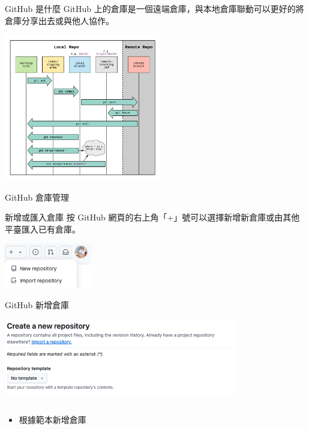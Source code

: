 \documentclass[xetex, unicode, 10pt, aspectratio=169]{beamer}
\begin{document}
\begin{frame}{GitHub 是什麼}
    GitHub 上的倉庫是一個遠端倉庫，與本地倉庫聯動可以更好的將倉庫分享出去或與他人協作。
    \begin{center}
        \includegraphics[width=2.7in]{./img/git-workflow.png}
    \end{center}
\end{frame}

\begin{frame}{GitHub 倉庫管理}
    \begin{block}{新增或匯入倉庫}
        按 GitHub 網頁的右上角「+」號可以選擇新增新倉庫或由其他平臺匯入已有倉庫。
        \begin{center}
            \includegraphics[width=1.5in]{./img/github-add-import-repo.png}
        \end{center}
    \end{block}
\end{frame}

\begin{frame}{GitHub 新增倉庫}
    \begin{center}
        \includegraphics[width=4in]{./img/github-create-repo-0.png}
    \end{center}

    \begin{columns}
        \begin{column}{6in}
            \begin{itemize}
                \item {}\quad 根據範本新增倉庫
            \end{itemize}
        \end{column}
    \end{columns}
\end{frame}
\end{document}
